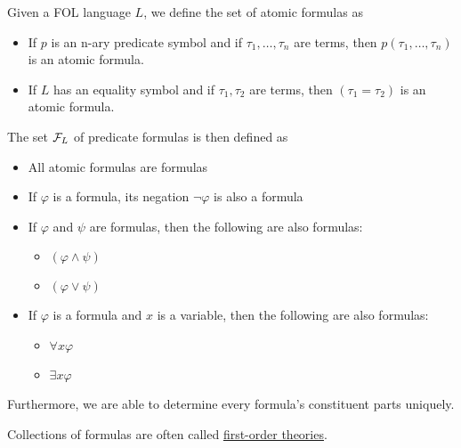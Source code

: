 \begin{definition}\label{def:first_order_formula}\cite[20]{Lectures:logic_programming}
  Given a FOL language $L$, we define the set of atomic formulas as
  \begin{itemize}
    \item If $p$ is an n-ary predicate symbol and if $\tau_1, \ldots, \tau_n$ are terms, then $p(\tau_1, \ldots, \tau_n)$ is an atomic formula.
    \item If $L$ has an equality symbol and if $\tau_1, \tau_2$ are terms, then $(\tau_1 = \tau_2)$ is an atomic formula.
  \end{itemize}

  The set $\mathcal F_L$ of predicate formulas is then defined as
  \begin{itemize}
    \item All atomic formulas are formulas
    \item If $\varphi$ is a formula, its negation $\neg \varphi$ is also a formula
    \item If $\varphi$ and $\psi$ are formulas, then the following are also formulas:
    \begin{itemize}
      \item $(\varphi \land \psi)$
      \item $(\varphi \lor \psi)$
    \end{itemize}
    \item If $\varphi$ is a formula and $x$ is a variable, then the following are also formulas:
    \begin{itemize}
      \item $\forall x \varphi$
      \item $\exists x \varphi$
    \end{itemize}
  \end{itemize}

  Furthermore, we are able to determine every formula's constituent parts uniquely.

  Collections of formulas are often called \uline{first-order theories}.


\end{definition}
